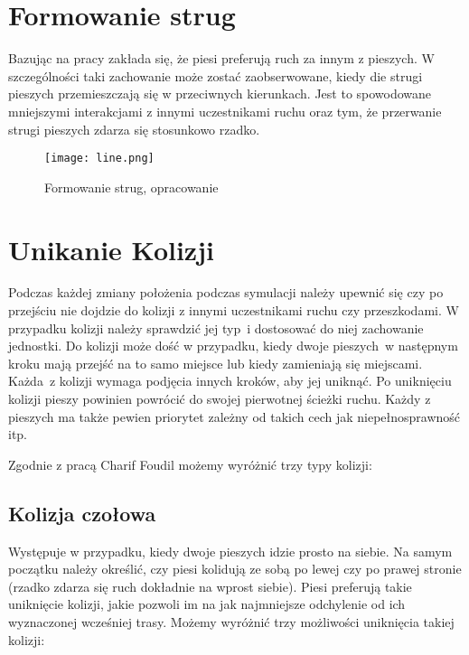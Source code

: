 \section{Formowanie strug}
\label{sec:strugi}

Bazując na pracy \cite{HeBuAjTw} zakłada się, że piesi preferują ruch za innym z pieszych. W szczególności taki zachowanie może zostać zaobserwowane, kiedy die strugi pieszych przemieszczają się w przeciwnych kierunkach. Jest to spowodowane mniejszymi interakcjami z innymi uczestnikami ruchu oraz tym, że przerwanie strugi pieszych zdarza się stosunkowo rzadko.

\begin{figure}
\centering
\texttt{[image: line.png]}
\caption{Formowanie strug, opracowanie \cite{HeBuAjTw}}
\end{figure}

\section{Unikanie Kolizji}
\label{sec:kolizje}

Podczas każdej zmiany położenia podczas symulacji należy upewnić się czy po przejściu nie dojdzie do kolizji z innymi uczestnikami ruchu czy przeszkodami. W przypadku kolizji należy sprawdzić jej typ~i dostosować do niej zachowanie jednostki. Do kolizji może dość w przypadku, kiedy dwoje pieszych~w następnym kroku mają przejść na to samo miejsce lub kiedy zamieniają się miejscami. Każda~z kolizji wymaga podjęcia innych kroków, aby jej uniknąć. Po uniknięciu kolizji pieszy powinien powrócić do swojej pierwotnej ścieżki ruchu. Każdy z pieszych ma także pewien priorytet zależny od takich cech jak niepełnosprawność itp.

Zgodnie z pracą Charif Foudil \cite{Collision} możemy wyróżnić trzy typy kolizji:

\subsection{Kolizja czołowa}

Występuje w przypadku, kiedy dwoje pieszych idzie prosto na siebie. Na samym początku należy określić, czy piesi kolidują ze sobą po lewej czy po prawej stronie (rzadko zdarza się ruch dokładnie na wprost siebie). Piesi preferują takie uniknięcie kolizji, jakie pozwoli im na jak najmniejsze odchylenie od ich wyznaczonej wcześniej trasy. Możemy wyróżnić trzy możliwości uniknięcia takiej kolizji:

